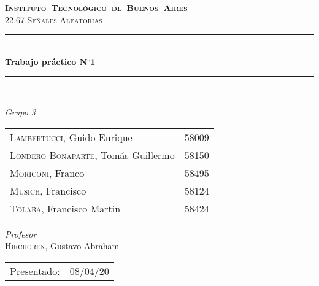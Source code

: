 \begin{titlepage}
\newcommand{\HRule}{\rule{\linewidth}{0.5mm}}
\center
\mbox{\textsc{\LARGE \bfseries {Instituto Tecnológico de Buenos Aires}}}\\[1.5cm]
\textsc{\Large 22.67 Señales Aleatorias}\\[0.5cm]


\HRule \\[0.6cm]
{ \Huge \bfseries Trabajo práctico N$^{\circ}$1}\\[0.4cm] 
\HRule \\[1.5cm]


{\large

\emph{Grupo 3}\\
\vspace{3px}

\begin{tabular}{lr} 	
\textsc{Lambertucci}, Guido Enrique  & 58009 \\
\textsc{Londero Bonaparte}, Tomás Guillermo  & 58150 \\
\textsc{Moriconi}, Franco  &  58495\\
\textsc{Musich}, Francisco  & 58124\\
\textsc{Tolaba}, Francisco Martin & 58424\\
\end{tabular}

\vspace{20px}

\emph{Profesor}\\
\textsc{Hirchoren}, Gustavo Abraham \\
\vspace{3px}

\vspace{100px}

\begin{tabular}{ll}

Presentado: & 08/04/20\\

\end{tabular}

}

\vfill

\end{titlepage}
